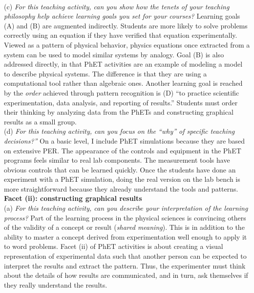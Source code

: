 \documentclass[../../../main.tex]{subfiles}
\begin{document}
\\
\vspace{0.25cm}
(c) \textit{For this teaching activity, can you show how the tenets of your teaching philosophy help achieve learning goals you
set for your courses?}  Learning goals (A) and (B) are augmented indirectly.  Students are more likely to solve problems correctly using an equation if they have verified that equation experimentally.  Viewed as a pattern of physical behavior, physics equations once extracted from a system can be used to model similar systems by analogy.  Goal (B) is also addressed directly, in that PhET activities are an example of modeling a model to describe physical systems.  The difference is that they are using a computational tool rather than algebraic ones.  Another learning goal is reached by the \textit{order} achieved through pattern recognition is (D) ``to practice scientific experimentation, data analysis, and reporting of results.''  Students must order their thinking by analyzing data from the PhETs and constructing graphical results as a small group.
\\
\vspace{0.25cm}
(d) \textit{For this teaching activity, can you focus on the ``why'' of specific teaching decisions?''}  On a basic level, I include PhET simulations because they are based on extensive PER.  The appearance of the controls and equipment in the PhET programs feels similar to real lab components.  The measurement tools have obvious controls that can be learned quickly.  Once the students have done an experiment with a PhET simulation, doing the real version on the lab bench is more straightforward because they already understand the tools and patterns.
\\
\vspace{0.25cm}
\textbf{Facet (ii): constructing graphical results}
\\
\vspace{0.25cm}
(a) \textit{For this teaching activity, can you describe your interpretation of the learning process?} Part of the learning process in the physical sciences is convincing others of the validity of a concept or result (\textit{shared meaning}).  This is in addition to the ability to master a concept derived from experimentation well enough to apply it to word problems.  Facet (ii) of PhET activities is about creating a visual representation of experimental data such that another person can be expected to interpret the results and extract the pattern.  Thus, the experimenter must think about the details of how results are communicated, and in turn, ask themselves if they really understand the results.
\end{document}
